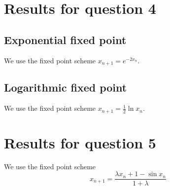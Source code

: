 \documentclass[11pt,letterpaper]{article}
\begin{document}


\section{Results for question 4}
\label{app:q4}

\subsection{Exponential fixed point}

We use the fixed point scheme $x_{n+1} = e^{-2x_n}$.



\subsection{Logarithmic fixed point}

We use the fixed point scheme $x_{n+1} = \frac{1}{2} \ln x_n$.



\section{Results for question 5}

We use the fixed point scheme
\begin{equation*}
  x_{n+1} = \frac{\lambda x_n + 1 - \sin {x_n}}{1 + \lambda}
\end{equation*}


\end{document}
